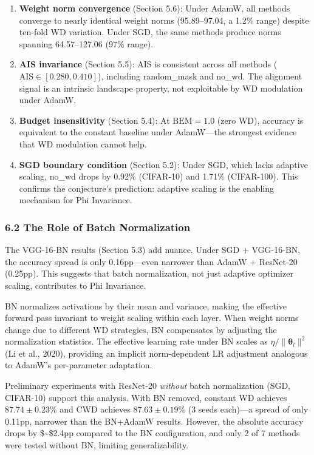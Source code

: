 \documentclass[
]{article}
\begin{document}
\begin{enumerate}
\def\labelenumi{\arabic{enumi}.}
\item
  \textbf{Weight norm convergence} (Section 5.6): Under AdamW, all
  methods converge to nearly identical weight norms (95.89--97.04, a
  1.2\% range) despite ten-fold WD variation. Under SGD, the same
  methods produce norms spanning 64.57--127.06 (97\% range).
\item
  \textbf{AIS invariance} (Section 5.5): AIS is consistent across all
  methods (\(\mathrm{AIS} \in [0.280, 0.410]\)), including random\_mask
  and no\_wd. The alignment signal is an intrinsic landscape property,
  not exploitable by WD modulation under AdamW.
\item
  \textbf{Budget insensitivity} (Section 5.4): At \(\mathrm{BEM} = 1.0\)
  (zero WD), accuracy is equivalent to the constant baseline under
  AdamW---the strongest evidence that WD modulation cannot help.
\item
  \textbf{SGD boundary condition} (Section 5.2): Under SGD, which lacks
  adaptive scaling, no\_wd drops by 0.92\% (CIFAR-10) and 1.71\%
  (CIFAR-100). This confirms the conjecture's prediction: adaptive
  scaling is the enabling mechanism for Phi Invariance.
\end{enumerate}

\hypertarget{the-role-of-batch-normalization}{%
\subsubsection{6.2 The Role of Batch
Normalization}\label{the-role-of-batch-normalization}}

The VGG-16-BN results (Section 5.3) add nuance. Under SGD + VGG-16-BN,
the accuracy spread is only 0.16pp---even narrower than AdamW +
ResNet-20 (0.25pp). This suggests that batch normalization, not just
adaptive optimizer scaling, contributes to Phi Invariance.

BN normalizes activations by their mean and variance, making the
effective forward pass invariant to weight scaling within each layer.
When weight norms change due to different WD strategies, BN compensates
by adjusting the normalization statistics. The effective learning rate
under BN scales as \(\eta / \|\boldsymbol{\theta}_l\|^2\) (Li et al.,
2020), providing an implicit norm-dependent LR adjustment analogous to
AdamW's per-parameter adaptation.

Preliminary experiments with ResNet-20 \emph{without} batch
normalization (SGD, CIFAR-10) support this analysis. With BN removed,
constant WD achieves \(87.74 \pm 0.23\)\% and CWD achieves
\(87.63 \pm 0.19\)\% (3 seeds each)---a spread of only 0.11pp, narrower
than the BN+AdamW results. However, the absolute accuracy drops by
\$\sim\$2.4pp compared to the BN configuration, and only 2 of 7 methods
were tested without BN, limiting generalizability.
\end{document}
